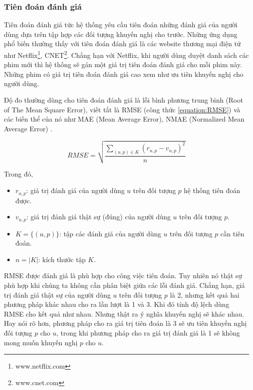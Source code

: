 \subsubsection{Tiên đoán đánh giá}
Tiên đoán đánh giá tức hệ thống yêu cầu tiên đoán những đánh giá của người dùng dựa trên tập hợp các đối tượng khuyến nghị cho trước. Những ứng dụng phổ biến thường thấy với tiên đoán đánh giá là các website thương mại điện tử như Netflix\footnote{www.netflix.com}, CNET\footnote{www.cnet.com}. Chẳng hạn với Netflix, khi người dùng duyệt danh sách các phim mới thì hệ thống sẽ gán một giá trị tiên đoán đánh giá cho mỗi phim này. Những phim có giá trị tiên đoán đánh giá cao xem như ưu tiên khuyến nghị cho người dùng.

Độ đo thường dùng cho tiên đoán đánh giá là lỗi bình phương trung bình (Root of The Mean Square Error), viết tắt là RMSE (công thức \ref{equation:RMSE}) và các biến thể của nó như MAE (Mean Average Error), NMAE (Normalized Mean Average Error) \cite{Celma:2010:EvaluationMetrics, ShaniG11}. 

\begin{equation} \label{equation:RMSE}
RMSE = \sqrt{\frac{ \sum\limits_{(u,p) \in K}^{} (r_{u,p} - v_{u,p})^2}{n}}
\end{equation}

Trong đó,
\begin{itemize}
\item $r_{u,p}$: giá trị đánh giá của người dùng $u$ trên đối tượng $p$ hệ thống tiên đoán được.
\item $v_{u,p}$: giá trị đánh giá thật sự (đúng) của người dùng $u$ trên đối tượng $p$.
\item $K = \{(u,p)\}$: tập các đánh giá của người dùng $u$ trên đối tượng $p$ cần tiên đoán.
\item $n = |K|$: kích thước tập $K$.
\end{itemize}

RMSE được đánh giá là phù hợp cho công việc tiên đoán. Tuy nhiên nó thật sự phù hợp khi chúng ta không cần phân biệt giữa các lỗi đánh giá. Chẳng hạn, giá trị đánh giá thật sự của người dùng $u$ trên đối tượng $p$ là 2, nhưng kết quả hai phương pháp khác nhau cho ra lần lượt là 1 và 3. Khi đó tính độ lệch dùng RMSE cho kết quả như nhau. Nhưng thật ra ý nghĩa khuyến nghị sẽ khác nhau. Hay nói rõ hơn, phương pháp cho ra giá trị tiên đoán là 3 sẽ ưu tiên khuyến nghị đối tượng $p$ cho $u$, trong khi phương pháp cho ra giá trị đánh giá là 1 sẽ không mong muốn khuyến nghị $p$ cho $u$.

